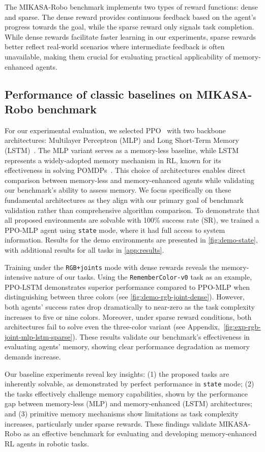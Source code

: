 The MIKASA-Robo benchmark implements two types of reward functions: dense and sparse. The dense reward provides continuous feedback based on the agent's progress towards the goal, while the sparse reward only signals task completion. While dense rewards facilitate faster learning in our experiments, sparse rewards better reflect real-world scenarios where intermediate feedback is often unavailable, making them crucial for evaluating practical applicability of memory-enhanced agents.

\subsection{Performance of classic baselines on MIKASA-Robo benchmark}
For our experimental evaluation, we selected PPO~\citep{schulman2017proximal} with two backbone architectures: Multilayer Perceptron (MLP) and Long Short-Term Memory (LSTM)~\citep{lstm}. The MLP variant serves as a memory-less baseline, while LSTM represents a widely-adopted memory mechanism in RL, known for its effectiveness in solving POMDPs~\citep{ni2021recurrent}. This choice of architectures enables direct comparison between memory-less and memory-enhanced agents while validating our benchmark's ability to assess memory. We focus specifically on these fundamental architectures as they align with our primary goal of benchmark validation rather than comprehensive algorithm comparison. To demonstrate that all proposed environments are solvable with 100\% success rate (SR), we trained a PPO-MLP agent using \texttt{state} mode, where it had full access to system information. Results for the demo environments are presented in \autoref{fig:demo-state}, with additional results for all tasks in \autoref{app:results}.

Training under the \texttt{RGB+joints} mode with dense rewards reveals the memory-intensive nature of our tasks. Using the \texttt{RememberColor-v0} task as an example, PPO-LSTM demonstrates superior performance compared to PPO-MLP when distinguishing between three colors (see \autoref{fig:demo-rgb-joint-dense}). However, both agents' success rates drop dramatically to near-zero as the task complexity increases to five or nine colors. Moreover, under sparse reward conditions, both architectures fail to solve even the three-color variant (see Appendix,~\autoref{fig:exp-rgb-joint-mlp-lstm-sparse}). These results validate our benchmark's effectiveness in evaluating agents' memory, showing clear performance degradation as memory demands increase.

Our baseline experiments reveal key insights: (1) the proposed tasks are inherently solvable, as demonstrated by perfect performance in \texttt{state} mode; (2) the tasks effectively challenge memory capabilities, shown by the performance gap between memory-less (MLP) and memory-enhanced (LSTM) architectures; and (3) primitive memory mechanisms show limitations as task complexity increases, particularly under sparse rewards. These findings validate MIKASA-Robo as an effective benchmark for evaluating and developing memory-enhanced RL agents in robotic tasks.